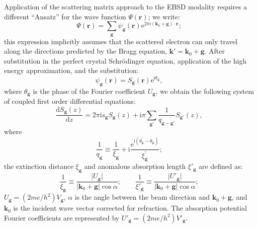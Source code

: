 \documentclass[DIV=calc, paper=letter, fontsize=11pt]{scrartcl}	 %
\begin{document}
Application of the scattering matrix approach to the EBSD modality requires a different ``Ansatz'' for the wave 
function $\Psi(\mathbf{r})$; we write:
\begin{equation}
	\Psi(\mathbf{r}) = \sum_{\mathbf{g}} \psi_{\mathbf{g}}(\mathbf{r}) 
	\mathrm{e}^{2\pi\mathrm{i}(\mathbf{k}_0+\mathbf{g})\cdot\mathbf{r}};\label{eq:planewaves}
\end{equation}
this expression implicitly assumes that the scattered electron can only travel along the directions predicted by the 
Bragg equation, $\mathbf{k}'=\mathbf{k}_0+\mathbf{g}$.  After substitution in the perfect crystal Schr\"odinger equation,
application of the high energy approximation, and the substitution:
\begin{equation}
	\psi_\mathbf{g}(\mathbf{r}) = S_{\mathbf{g}}(\mathbf{r}) \mathrm{e}^{\mathrm{i}\theta_{\mathbf{g}}},\label{eq:psig}
\end{equation}
where $\theta_{\mathbf{g}}$ is the phase of the Fourier coefficient $U_{\mathbf{g}}$, we obtain the following system of 
coupled first order differential equations:
\begin{equation}
    \frac{\mathrm{d} S_{\mathbf{g}}(z)}{\mathrm{d}z} =
    2\pi\mathrm{i}s_{\mathbf{g}}S_{\mathbf{g}}(z) + \mathrm{i}\pi {\sum_{\mathbf{g}'}}
    \frac{1}
    {q_{\mathbf{g}-\mathbf{g}'}}S_{\mathbf{g}'}(z),\label{eq:defectequation}
\end{equation}
where
\begin{equation}
	\frac{1}{q_{\mathbf{g}}} \equiv \frac{1}{\xi_{\mathbf{g}}} + \mathrm{i}
	\frac{\mathrm{e}^{\mathrm{i} (\theta^{\prime}_{\mathbf{g}}-\theta_{\mathbf{g}})}}{\xi^{\prime}_{\mathbf{g}}};
	\label{eq:defineq}
\end{equation}
the extinction distance $\xi_{\mathbf{g}}$ and anomalous absorption length $\xi'_{\mathbf{g}}$ are defined as:
\begin{equation}
	\frac{1}{\xi_{\mathbf{g}}}\equiv \frac{\vert U_{\mathbf{g}}\vert}{\vert\mathbf{k}_0+\mathbf{g}\vert\cos\alpha};\qquad
	\frac{1}{\xi'_{\mathbf{g}}}\equiv \frac{\vert U'_{\mathbf{g}}\vert}{\vert\mathbf{k}_0+\mathbf{g}\vert\cos\alpha};
\end{equation}
$U_{\mathbf{g}} = (2me/h^2) V_{\mathbf{g}} $, $\alpha$ is the angle between the beam direction and $\mathbf{k}_0+\mathbf{g}$, and $\mathbf{k}_0$ is 
the incident wave vector corrected for refraction.  The absorption potential Fourier coefficients are represented by $U'_{\mathbf{g}} = (2me/h^2) V'_{\mathbf{g}}$.
\end{document}
